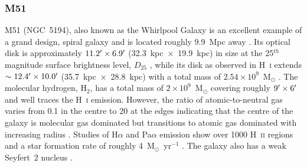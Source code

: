 \subsubsection{M51}\label{m51_general}
M51 (NGC~5194), also known as the Whirlpool Galaxy is an excellent example of a grand design, spiral galaxy and is located roughly 9.9~Mpc away \citep{2009AstL...35..599T}.  Its optical disk is approximately $11.2\mbox{$^\prime$} \times 6.9\mbox{$^\prime$}$ (32.3~kpc~$\times$~19.9~kpc) in size at the 25$^{th}$ magnitude surface brightness level, $D_{25}$ \citep{2003PASP..115..928K}, while its disk as observed in H~\textsc{i} extends $\sim 12.4\mbox{$^\prime$} \times 10.0\mbox{$^\prime$}$ (35.7~kpc~$\times$~28.8~kpc) with a total mass of $2.54 \times 10^{9}$~M$_{\odot}$ \citep{2008AJ....136.2563W}.  The molecular hydrogen, H$_{2}$, has a total mass of $2 \times 10^{9}$~M$_{\odot}$ covering roughly $9\mbox{$^\prime$} \times 6\mbox{$^\prime$}$ and well traces the H~\textsc{i} emission.  However, the ratio of atomic-to-neutral gas varies from 0.1 in the centre to 20 at the edges \citep{2007A&A...461..143S} indicating that the centre of the galaxy is molecular gas dominated but transitions to atomic gas dominated with increasing radius \citep{2007A&A...461..143S}.  Studies of H$\alpha$ and Pa$\alpha$ emission show over 1000 H~\textsc{ii} regions and a star formation rate of roughly 4~M$_{\odot}$~yr$^{-1}$ \citep{2001AJ....122.3017S}.  The galaxy also has a weak Seyfert~2 nucleus \citep{1997ApJS..112..315H}.

